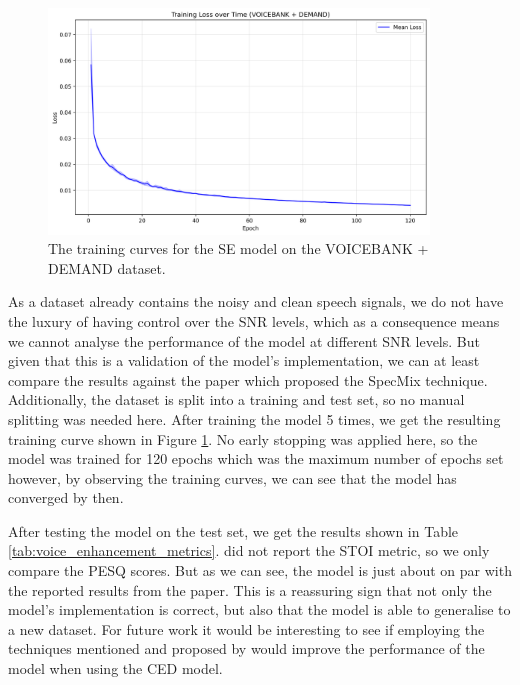 \documentclass[logo,bsc,singlespacing,parskip,online]{infthesis}
\begin{document}
\begin{figure}[h]
   \centering
   \includegraphics[width=0.9\textwidth]{se-VOICEBANK-training-losses.png}
   \caption{The training curves for the SE model on the VOICEBANK + DEMAND dataset.}
   \label{fig:se-voicebank-training-losses}
\end{figure}
As a dataset already contains the noisy and clean speech signals, we do not 
have the luxury of having control over the SNR levels, which as a 
consequence means we cannot analyse the performance of the model at different 
SNR levels. But given that this is a validation of the model's implementation, 
we can at least compare the results against the paper which proposed the SpecMix technique.
Additionally, the dataset is split into a training and test set, so no 
manual splitting was needed here. 
After training the model 5 times, we get the resulting training curve shown in Figure \ref{fig:se-voicebank-training-losses}.
No early stopping was applied here, so the model was trained for 120 epochs which was the maximum number of epochs set however,
by observing the training curves, we can see that the model has converged by then. 

After testing the model on the test set, we get the results shown in Table \ref{tab:voice_enhancement_metrics}.
\citet{kim_specmix_2021} did not report the STOI metric, so we only compare the PESQ scores.
But as we can see, the model is just about on par with the reported results from the paper.
This is a reassuring sign that not only the model's implementation is correct, but also
that the model is able to generalise to a new dataset. For future work it would 
be interesting to see if employing the techniques mentioned and proposed by \citet{kim_specmix_2021}
would improve the performance of the model when using the CED model. 
\end{document}
